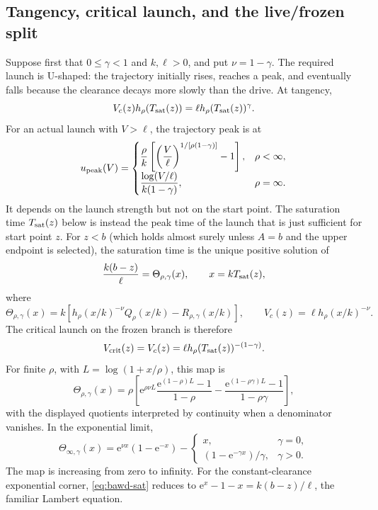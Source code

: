 \documentclass[12pt]{article}
\newcommand{\e}{\mathrm{e}}
\theoremstyle{remark}
\begin{document}
\subsection{Tangency, critical launch, and the live/frozen split}
\label{sec:bawd-saturation}
Suppose first that $0\le\gamma<1$ and $k,\ell>0$, and put $\nu=1-\gamma$. The required launch is U-shaped: the trajectory initially rises, reaches a peak, and eventually falls because the clearance decays more slowly than the drive. At tangency,
\[
  V_c(z)h_\rho(T_{\rm sat}(z))
  =\ell h_\rho(T_{\rm sat}(z))^\gamma.
\]
For an actual launch with $V>\ell$, the trajectory peak is at
\[
 u_{\rm peak}(V)=
 \begin{cases}
 \dfrac{\rho}{k}\left[
   \left(\dfrac{V}{\ell}\right)^{1/[\rho(1-\gamma)]}-1\right],
   &\rho<\infty,\\[8pt]
 \dfrac{\log(V/\ell)}{k(1-\gamma)},&\rho=\infty.
 \end{cases}
\]
It depends on the launch strength but not on the start point. The saturation time $T_{\rm sat}(z)$ below is instead the peak time of the launch that is just sufficient for start point $z$. For $z<b$ (which holds almost surely unless $A=b$ and the upper endpoint is selected), the saturation time is the unique positive solution of
\begin{equation}
 \frac{k(b-z)}{\ell}
 = \Theta_{\rho,\gamma}(x),\qquad x=kT_{\rm sat}(z),
 \label{eq:bawd-sat}
\end{equation}
where
\begin{equation}
 \Theta_{\rho,\gamma}(x)
 = k\left[
 h_\rho(x/k)^{-\nu}Q_\rho(x/k)
 -R_{\rho,\gamma}(x/k)\right],
 \qquad
 V_c(z)=\ell h_\rho(x/k)^{-\nu}.
 \label{eq:bawd-tangent-map}
\end{equation}
The critical launch on the frozen branch is therefore
\begin{equation}
 V_{\mathrm{crit}}(z)=V_c(z)
 =\ell h_\rho(T_{\rm sat}(z))^{-(1-\gamma)}.
 \label{eq:bawd-crit}
\end{equation}
For finite $\rho$, with $L=\log(1+x/\rho)$, this map is
\begin{equation}
 \Theta_{\rho,\gamma}(x)
 =\rho\left[
 \e^{\rho\nu L}\frac{\e^{(1-\rho)L}-1}{1-\rho}
 -\frac{\e^{(1-\rho\gamma)L}-1}{1-\rho\gamma}
 \right],
 \label{eq:bawd-theta-finite}
\end{equation}
with the displayed quotients interpreted by continuity when a denominator vanishes. In the exponential limit,
\begin{equation}
 \Theta_{\infty,\gamma}(x)
 =\e^{\nu x}(1-\e^{-x})
 -\begin{cases}
    x,&\gamma=0,\\
    (1-\e^{-\gamma x})/\gamma,&\gamma>0.
  \end{cases}
 \label{eq:bawd-theta-exp}
\end{equation}
The map is increasing from zero to infinity. For the constant-clearance exponential corner, \eqref{eq:bawd-sat} reduces to $\e^x-1-x=k(b-z)/\ell$, the familiar Lambert equation.
\end{document}
